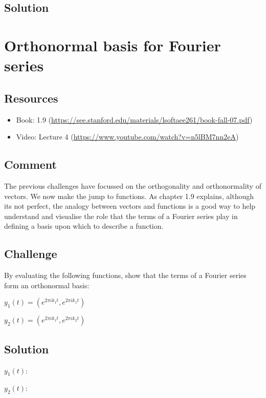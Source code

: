 \subsection*{Solution}




\newpage
\section{Orthonormal basis for Fourier series}

\subsection*{Resources}
\begin{itemize}
    \item Book: 1.9 (\url{https://see.stanford.edu/materials/lsoftaee261/book-fall-07.pdf})
    \item Video: Lecture 4 (\url{https://www.youtube.com/watch?v=n5lBM7nn2eA})
\end{itemize}

\subsection*{Comment}
The previous challenges have focussed on the orthogonality and orthonormality of vectors. We now make the jump to functions. As chapter 1.9 explains, although its not perfect, the analogy between vectors and functions is a good way to help understand and visualise the role that the terms of a Fourier series play in defining a basis upon which to describe a function.

\subsection*{Challenge}
By evaluating the following functions, show that the terms of a Fourier series form an orthonormal basis:

$y_1(t) = (e^{2 \pi i k_1 t}, e^{2 \pi i k_1 t})$

$y_2(t) = (e^{2 \pi i k_1 t}, e^{2 \pi i k_2 t})$

\subsection*{Solution}
$y_1(t)$:\\

$y_2(t)$:\\




